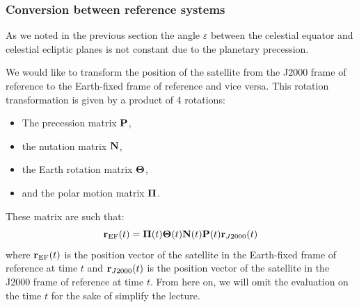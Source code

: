 \documentclass[../main.tex]{subfiles}
\begin{document}
\subsubsection{Conversion between reference systems}
As we noted in the previous section the angle $\varepsilon$ between the celestial equator and celestial ecliptic planes is not constant due to the planetary precession.

We would like to transform the position of the satellite from the J2000 frame of reference to the Earth-fixed frame of reference and vice versa. This rotation transformation is given by a product of 4 rotations:
\begin{itemize}
  \item The precession matrix $\boldsymbol{\mathrm{P}}$,
  \item the nutation matrix $\boldsymbol{\mathrm{N}}$,
  \item the Earth rotation matrix $\boldsymbol{\mathrm{\Theta}}$,
  \item and the polar motion matrix $\boldsymbol{\mathrm{\Pi}}$.
\end{itemize}
These matrix are such that:
\begin{equation}
  \boldsymbol{\mathrm{r}}_\mathrm{EF}(t)=\boldsymbol{\mathrm{\Pi}}(t)\boldsymbol{\mathrm{\Theta}}(t)\boldsymbol{\mathrm{N}}(t)\boldsymbol{\mathrm{P}}(t)\boldsymbol{\mathrm{r}}_{J2000}(t)
\end{equation}
where $\boldsymbol{\mathrm{r}}_\mathrm{EF}(t)$ is the position vector of the satellite in the Earth-fixed frame of reference at time $t$ and $\boldsymbol{\mathrm{r}}_{J2000}(t)$ is the position vector of the satellite in the J2000 frame of reference at time $t$. From here on, we will omit the evaluation on the time $t$ for the sake of simplify the lecture.
\end{document}
